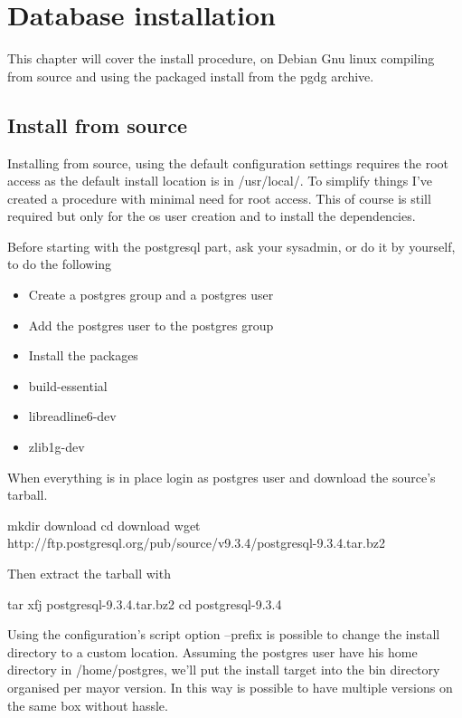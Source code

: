 \chapter{Database installation}
\label{cha:DB_INSTALL}
This chapter will cover the install procedure, on Debian Gnu linux compiling from source and using the packaged install from the pgdg archive.

\section{Install from source}
Installing from source, using the default configuration settings requires the root access as the default install location is in /usr/local/. 
To simplify things I've created a procedure with minimal need for root access.
This of course is still required but only for the os user creation and to install the dependencies. 

Before starting with the postgresql part, ask your sysadmin, or do it by yourself, to do the following

\begin{itemize}

 \item Create a postgres group and a postgres user
 \item Add the postgres user to the postgres group
 \item Install the packages
 \item build-essential
 \item libreadline6-dev
 \item zlib1g-dev
 
\end{itemize}


When everything is in place login as postgres user and download the source's tarball.

\begin{smallverbatim}
mkdir download
cd download
wget http://ftp.postgresql.org/pub/source/v9.3.4/postgresql-9.3.4.tar.bz2
\end{smallverbatim}

Then extract the tarball with

\begin{smallverbatim}
tar xfj postgresql-9.3.4.tar.bz2
cd postgresql-9.3.4
\end{smallverbatim}

Using the configuration’s script option --prefix is possible to change 
the install directory to a custom location.
Assuming the postgres user have his home directory in /home/postgres, we'll put 
the install target into the bin directory organised per
mayor version. In this way  is possible to have multiple versions on the same 
box without hassle.

